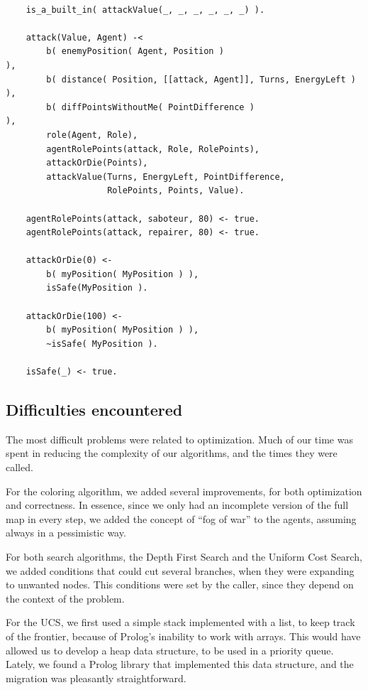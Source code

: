     \begin{small}
    \begin{verbatim}

    is_a_built_in( attackValue(_, _, _, _, _, _) ).

    attack(Value, Agent) -<
        b( enemyPosition( Agent, Position )                           ),
        b( distance( Position, [[attack, Agent]], Turns, EnergyLeft ) ),
        b( diffPointsWithoutMe( PointDifference )                     ),
        role(Agent, Role),
        agentRolePoints(attack, Role, RolePoints),
        attackOrDie(Points),
        attackValue(Turns, EnergyLeft, PointDifference, 
                    RolePoints, Points, Value).
        
    agentRolePoints(attack, saboteur, 80) <- true.
    agentRolePoints(attack, repairer, 80) <- true.

    attackOrDie(0) <- 
        b( myPosition( MyPosition ) ),
        isSafe(MyPosition ).

    attackOrDie(100) <- 
        b( myPosition( MyPosition ) ),
        ~isSafe( MyPosition ).  

    isSafe(_) <- true.
    \end{verbatim}
    \end{small}

\subsection{Difficulties encountered}
    The most difficult problems were related to optimization. Much of our time was 
    spent in reducing the complexity of our algorithms, and the times they 
    were called.

    For the coloring algorithm, we added several improvements, for both 
    optimization and correctness. In essence, since we only had an incomplete 
    version of the full map in every step, we added the concept of ``fog of war'' 
    to the agents, assuming always in a pessimistic way. 

    For both search algorithms, the Depth First Search and the Uniform Cost 
    Search, we added conditions that could cut several branches, when they were 
    expanding to unwanted nodes. This conditions were set by the caller, since 
    they depend on the context of the problem.

    For the UCS, we first used a simple stack implemented with a list, to keep 
    track of the frontier, because of Prolog's inability to work with arrays. This 
    would have allowed us to develop a heap data structure, to be used in a 
    priority queue. Lately, we found a Prolog library that implemented this data 
    structure, and the migration was pleasantly straightforward.

